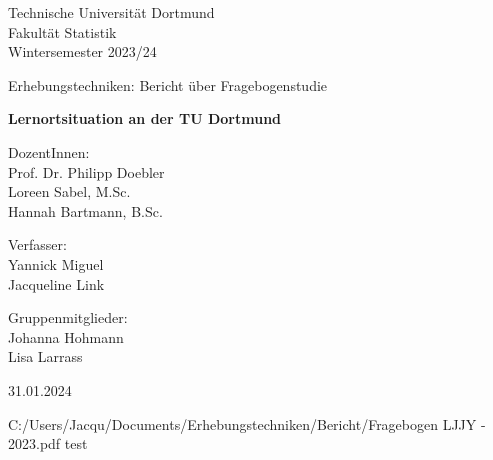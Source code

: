 \documentclass[a4paper]{article}
\begin{document}
\thispagestyle{empty}

\begin{center}
	\Large
	Technische Universität Dortmund\\
	Fakultät Statistik\\
	Wintersemester 2023/24\\
	
	\vspace{6em}
	
	Erhebungstechniken: Bericht über Fragebogenstudie
	
	\Huge
	\textbf{Lernortsituation an der TU Dortmund}
	
	\Large
	\vspace{4em}
	DozentInnen:	\\Prof. Dr. Philipp Doebler \\Loreen Sabel, M.Sc.\\Hannah Bartmann, B.Sc.


	\vspace{6em}
	Verfasser: \\
	Yannick Miguel \\Jacqueline Link
	
	\vspace{6em}
	Gruppenmitglieder:\\
	Johanna Hohmann\\
	Lisa Larrass
	
    \vspace{6em}
    
	31.01.2024
\end{center}

\newpage
\tableofcontents
\newpage\null\thispagestyle{empty}\newpage
 {C:/Users/Jacqu/Documents/Erhebungstechniken/Bericht/Fragebogen LJJY - 2023.pdf}
test
\end{document}
